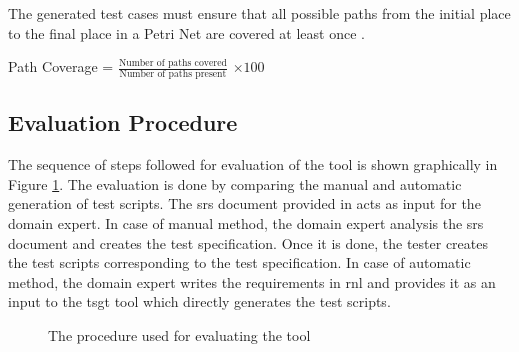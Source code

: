 \begin{definition}
\label{def:def8}

The generated test cases must ensure that all possible paths from the initial place to the final place in a Petri Net are covered at least once \cite{iso2013iso}.

Path Coverage = $\displaystyle\frac{\mbox{Number of paths covered}}{\mbox{Number of paths present}}$  $\times 100$
\end{definition}

\subsection{Evaluation Procedure}
The sequence of steps followed for evaluation of the tool is shown graphically in Figure \ref{fig:chap6fig1}. The evaluation is done by comparing the manual and automatic generation of test scripts. The \gls{srs} document provided in \cite{blazysoftware} acts as input for the domain expert. In case of manual method, the domain expert analysis the \gls{srs} document and creates the test specification. Once it is done, the tester creates the test scripts corresponding to the test specification. In case of automatic method, the domain expert writes the requirements in \gls{rnl} and provides it as an input to the \gls{tsgt} tool which directly generates the test scripts.

\begin{figure}[htb!]
\centering
{}
\caption{The procedure used for evaluating the tool}
\label{fig:chap6fig1}
\end{figure}


